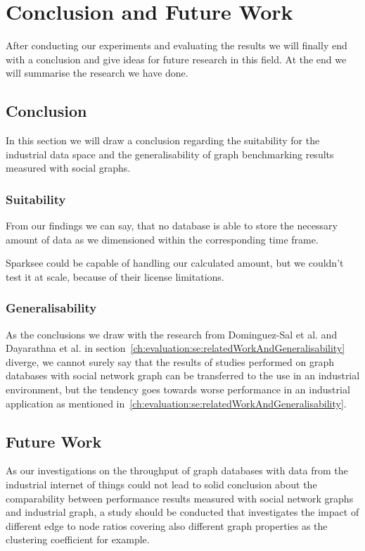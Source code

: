 \chapter{Conclusion and Future Work}
\label{ch:futureWork}
After conducting our experiments and evaluating the results we will finally end with a conclusion and give ideas for future research in this field.
At the end we will summarise the research we have done.

\section{Conclusion}
\label{ch:futureWork:se:conclusion}
In this section we will draw a conclusion regarding the suitability for the industrial data space and the generalisability of graph benchmarking results measured with social graphs.

\subsection{Suitability}
From our findings we can say,
that no database is able to store the necessary amount of data as we dimensioned within the corresponding time frame.

Sparksee could be capable of handling our calculated amount,
but we couldn't test it at scale,
because of their license limitations.

\subsection{Generalisability}
As the conclusions we draw with the research from Dominguez-Sal et al.\cite{TaoShen} and Dayarathna et al.\cite{Dayarathna2012} in section~\ref{ch:evaluation:se:relatedWorkAndGeneralisability} diverge,
we cannot surely say that the results of studies performed on graph databases with social network graph can be transferred to the use in an industrial environment,
but the tendency goes towards worse performance in an industrial application as mentioned in~\ref{ch:evaluation:se:relatedWorkAndGeneralisability}.

\section{Future Work}
As our investigations on the throughput of graph databases with data from the industrial internet of things could not lead to solid conclusion about the comparability between performance results measured with social network graphs and industrial graph,
a study should be conducted that investigates the impact of different edge to node ratios covering also different graph properties as the clustering coefficient for example.

